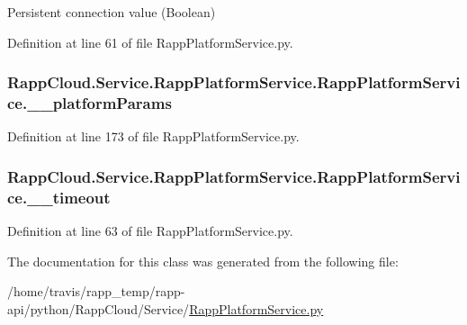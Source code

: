 Persistent connection value (Boolean) 



Definition at line 61 of file Rapp\-Platform\-Service.\-py.

\hypertarget{classRappCloud_1_1Service_1_1RappPlatformService_1_1RappPlatformService_a88c2942d52010ecd7f39b347e40ccc94}{
\subsubsection[{\-\_\-\-\_\-platform\-Params}]{\setlength{\rightskip}{0pt plus 5cm}Rapp\-Cloud.\-Service.\-Rapp\-Platform\-Service.\-Rapp\-Platform\-Service.\-\_\-\-\_\-platform\-Params\hspace{0.3cm}{\ttfamily [private]}}}\label{classRappCloud_1_1Service_1_1RappPlatformService_1_1RappPlatformService_a88c2942d52010ecd7f39b347e40ccc94}


Definition at line 173 of file Rapp\-Platform\-Service.\-py.

\hypertarget{classRappCloud_1_1Service_1_1RappPlatformService_1_1RappPlatformService_a6eea6da93f15eddddb1424615e37b106}{
\subsubsection[{\-\_\-\-\_\-timeout}]{\setlength{\rightskip}{0pt plus 5cm}Rapp\-Cloud.\-Service.\-Rapp\-Platform\-Service.\-Rapp\-Platform\-Service.\-\_\-\-\_\-timeout\hspace{0.3cm}{\ttfamily [private]}}}\label{classRappCloud_1_1Service_1_1RappPlatformService_1_1RappPlatformService_a6eea6da93f15eddddb1424615e37b106}


Definition at line 63 of file Rapp\-Platform\-Service.\-py.



The documentation for this class was generated from the following file\-:\begin{DoxyCompactItemize}
\item 
/home/travis/rapp\-\_\-temp/rapp-\/api/python/\-Rapp\-Cloud/\-Service/\hyperlink{RappPlatformService_8py}{Rapp\-Platform\-Service.\-py}\end{DoxyCompactItemize}
